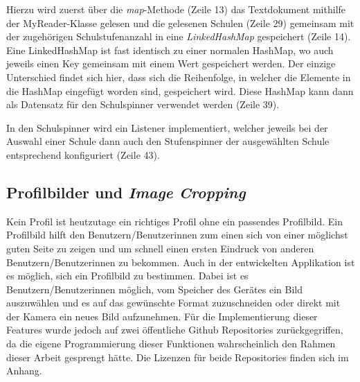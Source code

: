 \documentclass[../main.tex]{subfiles}
\begin{document}
	Hierzu wird zuerst über die \emph{map}-Methode (Zeile 13) das Textdokument mithilfe der MyReader-Klasse gelesen und die gelesenen Schulen (Zeile 29) gemeinsam mit der zugehörigen Schulstufenanzahl in eine \emph{LinkedHashMap} gespeichert (Zeile 14). Eine LinkedHashMap ist fast identisch zu einer normalen HashMap, wo auch jeweils einen Key gemeinsam mit einem Wert gespeichert werden. Der einzige Unterschied findet sich hier, dass sich die Reihenfolge, in welcher die Elemente in die HashMap eingefügt worden sind, gespeichert wird. Diese HashMap kann dann als Datensatz für den Schulspinner verwendet werden (Zeile 39).

	In den Schulspinner wird ein Listener implementiert, welcher jeweils bei der Auswahl einer Schule dann auch den Stufenspinner der ausgewählten Schule entsprechend konfiguriert (Zeile 43).

	\subsection{Profilbilder und \emph{Image Cropping}} \label{imageCropping}
	Kein Profil ist heutzutage ein richtiges Profil ohne ein passendes Profilbild. Ein Profilbild hilft den Benutzern/Benutzerinnen zum einen sich von einer möglichst guten Seite zu zeigen und um schnell einen ersten Eindruck von anderen Benutzern/Benutzerinnen zu bekommen. Auch in der entwickelten Applikation ist es möglich, sich ein Profilbild zu bestimmen. Dabei ist es Benutzern/Benutzerinnen möglich, vom Speicher des Gerätes ein Bild auszuwählen und es auf das gewünschte Format zuzuschneiden oder direkt mit der Kamera ein neues Bild aufzunehmen. Für die Implementierung dieser Features wurde jedoch auf zwei öffentliche Github Repositories zurückgegriffen, da die eigene Programmierung dieser Funktionen wahrscheinlich den Rahmen dieser Arbeit gesprengt hätte. Die Lizenzen für beide Repositories finden sich im Anhang.
	
\end{document}
